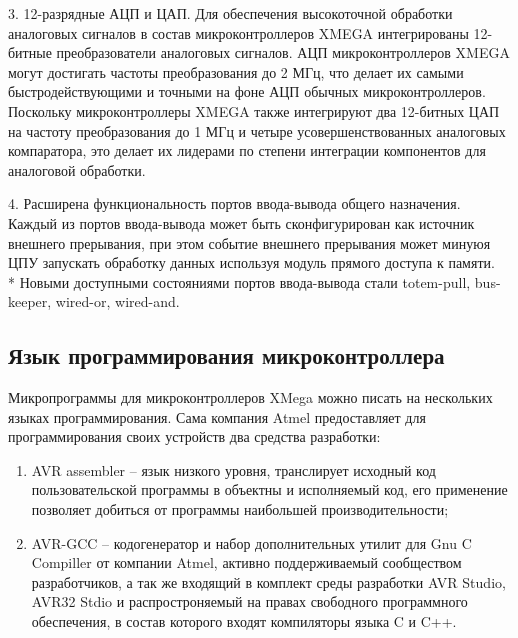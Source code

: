\begin{par}
    3. 12-разрядные АЦП и ЦАП. Для обеспечения высокоточной обработки аналоговых сигналов в состав 
    микроконтроллеров XMEGA интегрированы 12-битные преобразователи аналоговых сигналов. АЦП
    микроконтроллеров XMEGA могут достигать частоты преобразования до 2 МГц, что делает их самыми
	быстродействующими и точными на фоне АЦП обычных микроконтроллеров.
	Поскольку микроконтроллеры XMEGA также интегрируют два 12-битных ЦАП на частоту преобразования
	до 1 МГц и четыре усовершенствованных аналоговых компаратора, это делает их лидерами по
	степени интеграции компонентов для аналоговой обработки.
\end{par}

\begin{par}
   4. Расширена функциональность портов ввода-вывода общего назначения. Каждый из портов
    ввода-вывода может быть сконфигурирован как источник внешнего прерывания, при этом событие внешнего прерывания
    может минуюя ЦПУ запускать обработку данных используя модуль прямого доступа к памяти. \\*
    Новыми доступными состояниями портов ввода-вывода стали totem-pull, bus-keeper, wired-or, wired-and.
\end{par}


\subsection{Язык программирования микроконтроллера}
\begin{par}
Микропрограммы для микроконтроллеров XMega можно писать на нескольких языках программирования.
Сама компания Atmel предоставляет для программирования своих устройств два средства разработки:
	\begin{enumerate}
		\item{}AVR assembler -- язык низкого уровня, транслирует исходный код пользовательской
                программы в объектны и исполняемый код, его применение позволяет
                добиться от программы наибольшей производительности;
		\item{}AVR-GCC -- кодогенератор и набор дополнительных утилит для Gnu C Compiller от
                компании Atmel, активно поддерживаемый сообществом разработчиков, а так же
                входящий в комплект среды разработки AVR Studio, AVR32 Stdio и
                распростроняемый на правах свободного программного обеспечения, в состав
				которого входят компиляторы языка C и C++.
	\end{enumerate}
\end{par}

